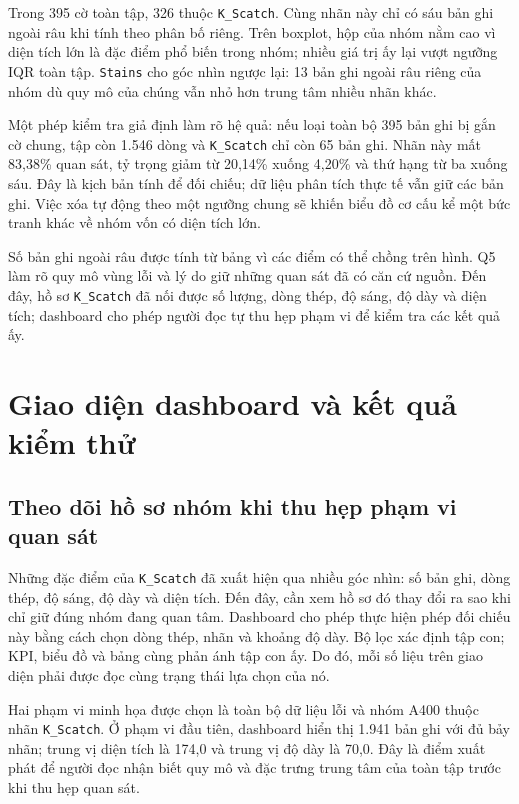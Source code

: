 \documentclass[12pt,a4paper,oneside]{report}
\newcommand{\maCot}[1]{{\urlstyle{tt}\def\UrlBreaks{\do\_\do\/\do\.}\def\UrlBigBreaks{}\nolinkurl{#1}}}
\begin{document}
Trong 395 cờ toàn tập, 326 thuộc \maCot{K_Scatch}. Cùng nhãn này chỉ có sáu bản ghi ngoài râu khi tính theo phân bố riêng. Trên boxplot, hộp của nhóm nằm cao vì diện tích lớn là đặc điểm phổ biến trong nhóm; nhiều giá trị ấy lại vượt ngưỡng IQR toàn tập. \maCot{Stains} cho góc nhìn ngược lại: 13 bản ghi ngoài râu riêng của nhóm dù quy mô của chúng vẫn nhỏ hơn trung tâm nhiều nhãn khác.

Một phép kiểm tra giả định làm rõ hệ quả: nếu loại toàn bộ 395 bản ghi bị gắn cờ chung, tập còn 1.546 dòng và \maCot{K_Scatch} chỉ còn 65 bản ghi. Nhãn này mất 83,38\% quan sát, tỷ trọng giảm từ 20,14\% xuống 4,20\% và thứ hạng từ ba xuống sáu. Đây là kịch bản tính để đối chiếu; dữ liệu phân tích thực tế vẫn giữ các bản ghi. Việc xóa tự động theo một ngưỡng chung sẽ khiến biểu đồ cơ cấu kể một bức tranh khác về nhóm vốn có diện tích lớn.

Số bản ghi ngoài râu được tính từ bảng vì các điểm có thể chồng trên hình. Q5 làm rõ quy mô vùng lỗi và lý do giữ những quan sát đã có căn cứ nguồn. Đến đây, hồ sơ \maCot{K_Scatch} đã nối được số lượng, dòng thép, độ sáng, độ dày và diện tích; dashboard cho phép người đọc tự thu hẹp phạm vi để kiểm tra các kết quả ấy.

\section{Giao diện dashboard và kết quả kiểm thử}
\label{sec:ch4dashboard}

\subsection{Theo dõi hồ sơ nhóm khi thu hẹp phạm vi quan sát}

Những đặc điểm của \maCot{K_Scatch} đã xuất hiện qua nhiều góc nhìn: số bản ghi, dòng thép, độ sáng, độ dày và diện tích. Đến đây, cần xem hồ sơ đó thay đổi ra sao khi chỉ giữ đúng nhóm đang quan tâm. Dashboard cho phép thực hiện phép đối chiếu này bằng cách chọn dòng thép, nhãn và khoảng độ dày. Bộ lọc xác định tập con; KPI, biểu đồ và bảng cùng phản ánh tập con ấy. Do đó, mỗi số liệu trên giao diện phải được đọc cùng trạng thái lựa chọn của nó.

Hai phạm vi minh họa được chọn là toàn bộ dữ liệu lỗi và nhóm A400 thuộc nhãn \maCot{K_Scatch}. Ở phạm vi đầu tiên, dashboard hiển thị 1.941 bản ghi với đủ bảy nhãn; trung vị diện tích là 174,0 và trung vị độ dày là 70,0. Đây là điểm xuất phát để người đọc nhận biết quy mô và đặc trưng trung tâm của toàn tập trước khi thu hẹp quan sát.
\end{document}
